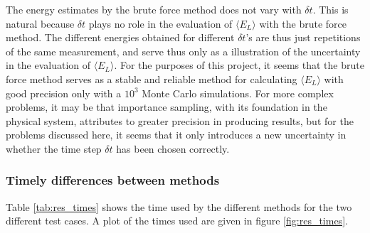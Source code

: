 The energy estimates by the brute force method does not vary with $\delta t$. 
This is natural because $\delta t$ plays no role in the evaluation of $\langle E_L \rangle$ with the brute force method. 
The different energies obtained for different $\delta t$'s are thus just repetitions of the same measurement, and serve thus only as a illustration of the uncertainty in the evaluation of $\langle E_L \rangle$. 
For the purposes of this project, it seems that the brute force method serves as a stable and reliable method for calculating $\langle E_L \rangle$ with good precision only with a $10^3$ Monte Carlo simulations. 
For more complex problems, it may be that importance sampling, with its foundation in the physical system, attributes to greater precision in producing results, but for the problems discussed here, it seems that it only introduces a new uncertainty in whether the time step $\delta t$ has been chosen correctly. 











\subsubsection{Timely differences between methods} \label{sec:res_timely_diff}

Table \ref{tab:res_times} shows the time used by the different methods for the two different test cases.
A plot of the times used are given in figure \ref{fig:res_times}. 

